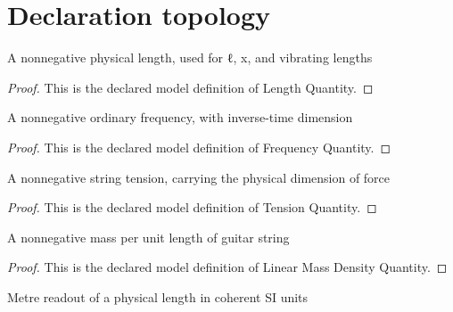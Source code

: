 \section{Declaration topology}
\begin{definition}
  \label{def:physics:phyx-mini-0218:phyxminiproblems-problemphyxmini0218-lengthquantity}
  A nonnegative physical length, used for ℓ, x, and vibrating lengths
\end{definition}
\begin{proof}
  This is the declared model definition of Length Quantity.
\end{proof}
\begin{definition}
  \label{def:physics:phyx-mini-0218:phyxminiproblems-problemphyxmini0218-frequencyquantity}
  A nonnegative ordinary frequency, with inverse-time dimension
\end{definition}
\begin{proof}
  This is the declared model definition of Frequency Quantity.
\end{proof}
\begin{definition}
  \label{def:physics:phyx-mini-0218:phyxminiproblems-problemphyxmini0218-tensionquantity}
  A nonnegative string tension, carrying the physical dimension of force
\end{definition}
\begin{proof}
  This is the declared model definition of Tension Quantity.
\end{proof}
\begin{definition}
  \label{def:physics:phyx-mini-0218:phyxminiproblems-problemphyxmini0218-linearmassdensityquantity}
  A nonnegative mass per unit length of guitar string
\end{definition}
\begin{proof}
  This is the declared model definition of Linear Mass Density Quantity.
\end{proof}
\begin{definition}
  \label{def:physics:phyx-mini-0218:phyxminiproblems-problemphyxmini0218-lengthinmeters}
  Metre readout of a physical length in coherent SI units
\end{definition}
